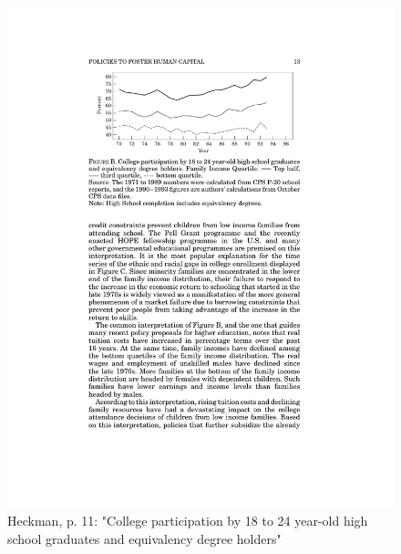 \documentclass[12pt,a4paper]{article}
\begin{document}
            \begin{figure}[htb]
      \centering
      \includegraphics[width=12cm]{Meeting 10 Policies to foster human capital - Seite 11.pdf}
      \caption{Heckman, p. 11: "College participation by 18 to 24 year-old high school graduates and equivalency degree holders"}
      \label{fig:Heckman collegeparticipation}
    \end{figure}
\end{document}
